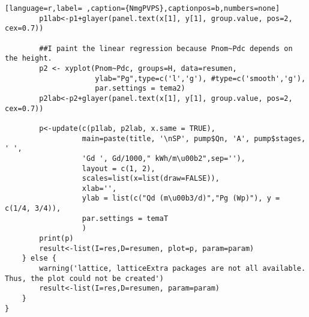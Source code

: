 \begin{lstlisting}[language=r,label= ,caption={NmgPVPS},captionpos=b,numbers=none]
        p1lab<-p1+glayer(panel.text(x[1], y[1], group.value, pos=2, cex=0.7))

        ##I paint the linear regression because Pnom~Pdc depends on the height.
        p2 <- xyplot(Pnom~Pdc, groups=H, data=resumen,
                     ylab="Pg",type=c('l','g'), #type=c('smooth','g'),
                     par.settings = tema2)
        p2lab<-p2+glayer(panel.text(x[1], y[1], group.value, pos=2, cex=0.7))

        p<-update(c(p1lab, p2lab, x.same = TRUE),
                  main=paste(title, '\nSP', pump$Qn, 'A', pump$stages, ' ',
                  'Gd ', Gd/1000," kWh/m\u00b2",sep=''),
                  layout = c(1, 2),
                  scales=list(x=list(draw=FALSE)),
                  xlab='',              
                  ylab = list(c("Qd (m\u00b3/d)","Pg (Wp)"), y = c(1/4, 3/4)),
                  par.settings = temaT
                  )
        print(p)
        result<-list(I=res,D=resumen, plot=p, param=param)
    } else {
        warning('lattice, latticeExtra packages are not all available. Thus, the plot could not be created')
        result<-list(I=res,D=resumen, param=param)
    }
}
\end{lstlisting}

